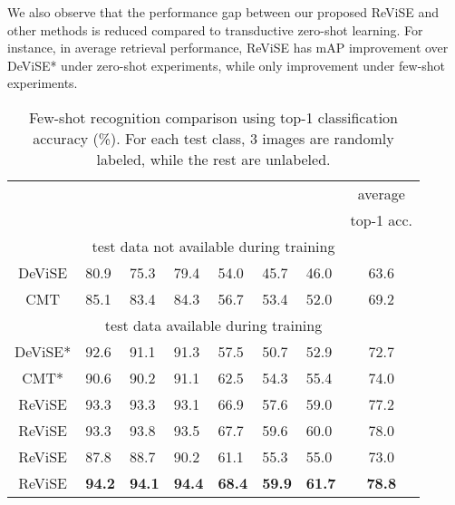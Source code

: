 {{We also observe that the performance gap between our proposed ReViSE and other methods is reduced compared to transductive zero-shot learning. For instance, in average retrieval performance, ReViSE has  mAP improvement over DeViSE* under zero-shot experiments, while only  improvement under few-shot experiments.  


\begin{table}[t!]
\centering
\caption{\footnotesize Few-shot recognition comparison using top-1 classification accuracy (\%). For each test class, 3 images are randomly labeled, while the rest are unlabeled.}
\vspace{1mm}
\scalebox{0.72}
{
\begin{tabular}{|c||lll||lll||c|}
\hline
 & \multicolumn{3}{c||}{}                                                      & \multicolumn{3}{c||}{}                                                     & average                          \\
                        & \multicolumn{1}{c}{} & \multicolumn{1}{c}{} & \multicolumn{1}{c||}{} & \multicolumn{1}{c}{} & \multicolumn{1}{c}{} & \multicolumn{1}{c||}{} & top-1 acc. \\  \hline \hline
\multicolumn{8}{|c|}{test data not available during training}                                                                                                                                                                                        \\ \hline \hline
DeViSE \cite{frome2013devise}     &   80.9     &   75.3 &  79.4  & 54.0  &      45.7  &  46.0   &  63.6 \\
CMT \cite{socher2013zero}    &  85.1  &    83.4    &  84.3   &    56.7     &    53.4   &    52.0   & 69.2  \\ \hline \hline
\multicolumn{8}{|c|}{test data available during training}                                                                                                                                                                                        \\ \hline \hline
DeViSE* \cite{frome2013devise}     &    92.6      &      91.1  &   91.3     &   57.5     &      50.7   &   52.9       &    72.7   \\
CMT* \cite{socher2013zero}    &  90.6  &    90.2    &  91.1   &    62.5     &    54.3   &    55.4   &  74.0    \\
ReViSE &  93.3    &    93.3     &   93.1   &   66.9      &    57.6    &   59.0    &   77.2  \\
ReViSE &   93.3  &  93.8  &     93.5       &  67.7  &   59.6    &     60.0    &   78.0  \\
ReViSE &   87.8 &  88.7 &    90.2     &  61.1 &   55.3  &  55.0   &  73.0 \\
ReViSE     &    {\bf 94.2}    &    {\bf 94.1}   &  {\bf 94.4}  &   {\bf 68.4}   &  {\bf 59.9} &  {\bf 61.7}    &    {\bf 78.8}    \\ \hline
\end{tabular}
}
\vspace{-4mm}
\label{tbl:few_recog}
\end{table}

}}
